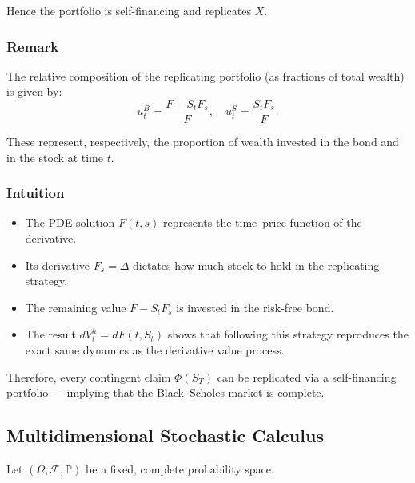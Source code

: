 \documentclass[12pt,a4paper]{article}
\theoremstyle{definition}
\newcommand{\Prob}{\mathbb{P}}
\begin{document}
Hence the portfolio is self-financing and replicates $X$.

\begin{center}
\end{center}

\subsubsection{Remark}

The relative composition of the replicating portfolio (as fractions of total wealth) is given by:
\[
u_t^B = \frac{F - S_t F_s}{F}, \quad u_t^S = \frac{S_t F_s}{F}.
\]

These represent, respectively, the proportion of wealth invested in the bond and in the stock at time $t$.

\subsubsection{Intuition}

\begin{itemize}
\item The PDE solution $F(t,s)$ represents the time–price function of the derivative.
\item Its derivative $F_s = \Delta$ dictates how much stock to hold in the replicating strategy.
\item The remaining value $F - S_t F_s$ is invested in the risk-free bond.
\item The result $dV_t^h = dF(t, S_t)$ shows that following this strategy reproduces the exact same dynamics as the derivative value process.
\end{itemize}

Therefore, every contingent claim $\Phi(S_T)$ can be replicated via a self-financing portfolio — implying that the Black–Scholes market is complete.

\subsection{Multidimensional Stochastic Calculus}

Let $(\Omega, \mathcal{F}, \Prob)$ be a fixed, complete probability space.
\end{document}
